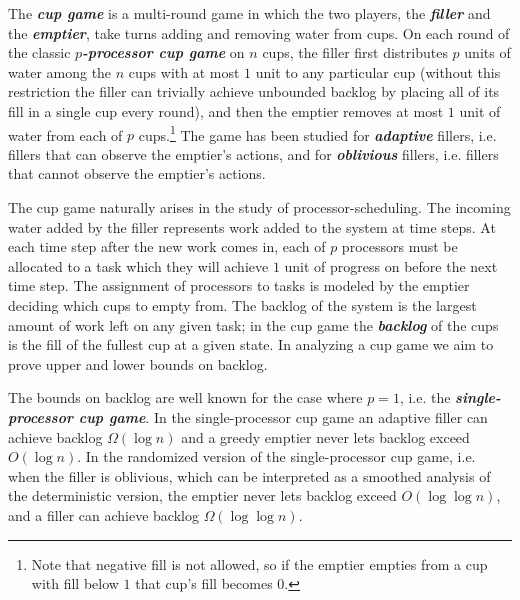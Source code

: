 \documentclass[twocolumn]{article}[10pt]
\newcommand{\defn}[1]{{\textit{\textbf{\boldmath #1}}}\xspace}
\renewcommand{\paragraph}[1]{\vspace{0.09in}\noindent{\bf \boldmath #1.}}
\begin{document}
\paragraph{Definition and Motivation}
The \defn{cup game} is a multi-round game in which the two players, the
\defn{filler} and the \defn{emptier}, take turns adding and removing water
from cups. On each round of the classic \defn{$p$-processor cup game} on $n$
cups, the filler first distributes $p$ units of water among
the $n$ cups with at most $1$ unit to any particular cup (without this
restriction the filler can trivially achieve unbounded backlog by placing all
of its fill in a single cup every round), and then the emptier 
removes at most $1$ unit of water from each of $p$ cups.\footnote{Note that negative
fill is not allowed, so if the emptier empties from a cup with fill below $1$
that cup's fill becomes $0$.} The game has been studied for \defn{adaptive}
fillers, i.e. fillers that can observe the emptier's actions, and for
\defn{oblivious} fillers, i.e. fillers that cannot observe the emptier's actions.

The cup game naturally arises in the study of processor-scheduling. The
incoming water added by the filler represents work added to the system at time
steps. At each time step after the new work comes in, each of $p$ processors
must be allocated to a task which they will achieve $1$ unit of progress on
before the next time step. The assignment of processors to tasks is modeled by
the emptier deciding which cups to empty from. The backlog of the system is the
largest amount of work left on any given task; in the cup game the
\defn{backlog} of the cups is the fill of the fullest cup at a given state. In
analyzing a cup game we aim to prove upper and lower bounds on backlog.

\paragraph{Previous Work}
The bounds on backlog are well known for the case where $p=1$, i.e. the
\defn{single-processor cup game}.
In the single-processor cup game an adaptive filler can achieve backlog
$\Omega(\log n)$ and a greedy emptier never lets backlog exceed $O(\log n)$. In
the randomized version of the single-processor cup game, i.e. when the filler
is oblivious, which can be interpreted as a smoothed analysis of the
deterministic version, the emptier never lets backlog exceed $O(\log \log n)$,
and a filler can achieve backlog $\Omega(\log\log n)$.
\end{document}
